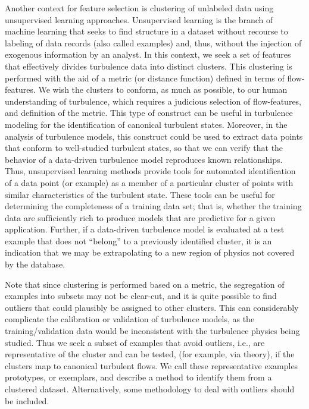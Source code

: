 Another context for feature selection is clustering of unlabeled data using unsupervised learning approaches. Unsupervised learning is the branch of machine learning that seeks to ﬁnd structure in a dataset without recourse to labeling of data records (also called examples) and, thus, without the injection of exogenous information by an analyst. In this context, we seek a set of features that
effectively divides turbulence data into distinct clusters. This clustering is performed with the aid of a
metric (or distance function) deﬁned in terms of ﬂow-features. We wish the clusters to conform, as much as
possible, to our human understanding of turbulence, which requires a judicious selection of ﬂow-features,
and deﬁnition of the metric. This type of construct can be useful in turbulence modeling for the
identiﬁcation of canonical turbulent states. Moreover, in the analysis of turbulence models, this construct could be used to extract data points that conform to well-studied turbulent states, so that we can verify that the behavior of a data-driven turbulence model reproduces known relationships. Thus, unsupervised learning methods provide tools for automated identiﬁcation of a data point (or example) as a member of a particular cluster of points with similar characteristics of the turbulent state. These tools can be useful for determining the completeness of a training data set; that is, whether the training data are sufﬁciently rich to produce models that are predictive for a given application. Further, if a data-driven turbulence model is evaluated at a test example that does not “belong” to a previously identiﬁed cluster, it is an indication that we may be extrapolating to a new region of physics not covered by the database.

Note that since clustering is performed based on a metric, the segregation of examples into subsets may not be clear-cut, and it is quite possible to ﬁnd outliers that could plausibly be assigned to other clusters. This can considerably complicate the calibration or validation of turbulence models, as the training/validation data would be inconsistent with the turbulence physics being studied. Thus we seek a subset of examples that avoid outliers, i.e., are representative of the cluster and can be tested, (for example, via theory), if the clusters map to canonical turbulent ﬂows. We call these representative examples prototypes, or exemplars, and describe a method to identify them from a clustered dataset. Alternatively, some methodology to deal with outliers should be included.

